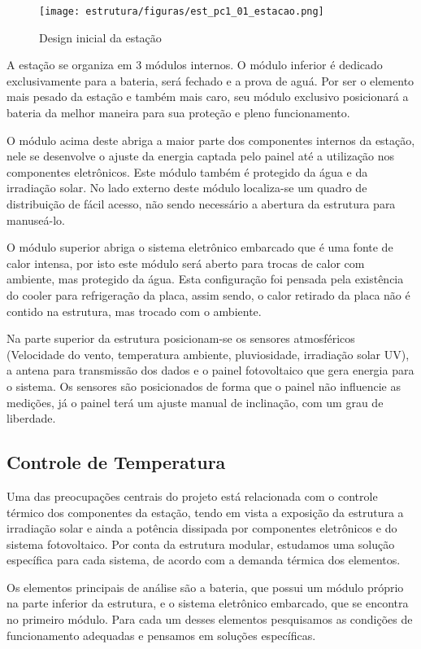 	\begin{figure}[H]
	\centering
	\texttt{[image: estrutura/figuras/est\_pc1\_01\_estacao.png]}
  	\caption{Design inicial da estação}
  	\label{Estação}
	\end{figure}
	
	A estação se organiza em 3 módulos internos. O módulo inferior é dedicado exclusivamente para a bateria, será fechado e a prova de aguá. Por ser o elemento mais pesado da estação e também mais caro, seu módulo exclusivo posicionará a bateria da melhor maneira para sua proteção e pleno funcionamento.
	
	O módulo acima deste abriga a maior parte dos componentes internos da estação, nele se desenvolve o ajuste da energia captada pelo painel até a utilização nos componentes eletrônicos. Este módulo também é protegido da água e da irradiação solar. No lado externo deste módulo localiza-se um quadro de distribuição de fácil acesso, não sendo necessário a abertura da estrutura para manuseá-lo.
	
	O módulo superior abriga o sistema eletrônico embarcado que é uma fonte de calor intensa, por isto este módulo será aberto para trocas de calor com ambiente, mas protegido da água. Esta configuração foi pensada pela existência do cooler para refrigeração da placa, assim sendo, o calor retirado da placa não é contido na estrutura, mas trocado com o ambiente.
	
	Na parte superior da estrutura posicionam-se os sensores atmosféricos (Velocidade do vento, temperatura ambiente, pluviosidade, irradiação solar UV), a antena para transmissão dos dados e o painel fotovoltaico que gera energia para o sistema. Os sensores são posicionados de forma que o painel não influencie as medições, já o painel terá um ajuste manual de inclinação, com um grau de liberdade. 
	
	
	\subsection{Controle de Temperatura}
	Uma das preocupações centrais do projeto está relacionada com o controle térmico dos componentes da estação, tendo em vista a exposição da estrutura a irradiação solar e ainda a potência dissipada por componentes eletrônicos e do sistema fotovoltaico. Por conta da estrutura modular, estudamos uma solução específica para cada sistema, de acordo com a demanda térmica dos elementos.
 
 Os elementos principais de análise são a bateria, que possui um  módulo próprio na parte inferior da estrutura, e o sistema eletrônico embarcado, que se encontra no primeiro módulo. Para cada um desses elementos pesquisamos as condições de funcionamento adequadas e pensamos em soluções específicas.
 
